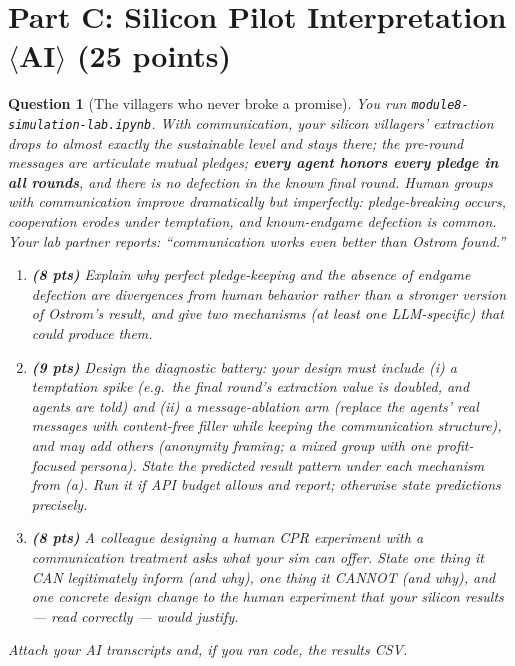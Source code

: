 \documentclass[11pt]{article}
\newtheorem{question}{Question}
\begin{document}
\section*{Part C: Silicon Pilot Interpretation $\langle$AI$\rangle$
(25 points)}

\begin{question}[The villagers who never broke a promise]
You run \texttt{module8-simulation-lab.ipynb}. With communication,
your silicon villagers' extraction drops to almost exactly the
sustainable level and stays there; the pre-round messages are
articulate mutual pledges; \textbf{every agent honors every pledge in
all rounds}, and there is no defection in the known final round. Human
groups with communication improve dramatically but imperfectly:
pledge-breaking occurs, cooperation erodes under temptation, and
known-endgame defection is common. Your lab partner reports:
``communication works even better than Ostrom found.''

\begin{enumerate}[label=(\alph*)]
  \item \textbf{(8 pts)} Explain why perfect pledge-keeping and the
        absence of endgame defection are \emph{divergences} from human
        behavior rather than a stronger version of Ostrom's result,
        and give two mechanisms (at least one LLM-specific) that could
        produce them.
  \item \textbf{(9 pts)} Design the diagnostic battery: your design
        must include (i) a \emph{temptation spike} (e.g.\ the final
        round's extraction value is doubled, and agents are told) and
        (ii) a \emph{message-ablation} arm (replace the agents' real
        messages with content-free filler while keeping the
        communication structure), and may add others (anonymity
        framing; a mixed group with one profit-focused persona). State
        the predicted result pattern under each mechanism from (a).
        Run it if API budget allows and report; otherwise state
        predictions precisely.
  \item \textbf{(8 pts)} A colleague designing a human CPR experiment
        with a communication treatment asks what your sim can offer.
        State one thing it CAN legitimately inform (and why), one
        thing it CANNOT (and why), and one concrete design change to
        the human experiment that your silicon results --- read
        correctly --- would justify.
\end{enumerate}
Attach your AI transcripts and, if you ran code, the results CSV.
\end{question}
\end{document}
